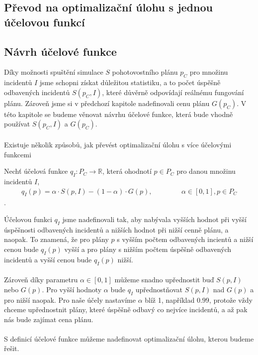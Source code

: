 \subsection{Převod na optimalizační úlohu s jednou účelovou funkcí}

\subsection{Návrh účelové funkce}

Díky možnosti spuštění simulace $S$ pohotovostního plánu $p_C$ pro množinu incidentů $I$ jsme schopni získat důležitou statistiku, a to počet úspěšně odbavených incidentů $S(p_C, I)$,
které důvěrně odpovídají reálnému fungování plánu. Zároveň jsme si v předchozí kapitole %
nadefinovali cenu plánu $G(p_C)$. V této kapitole se budeme věnovat návrhu účelové funkce, která bude vhodně používat $S(p_C, I)$ a $G(p_C)$.
\\
\\
Existuje několik způsobů, jak převést optimalizační úlohu s více účelovými funkcemi

\begin{definice}
Nechť účelová funkce $q_I \colon P_C \rightarrow \mathbb{R}$, která ohodnotí $p \in P_C$ pro danou množinu incidentů $I$,
  \begin{align}
    q_I(p) = \alpha \cdot S(p, I) - (1 - \alpha) \cdot G(p), \hspace{50pt} \alpha \in [0, 1], p \in P_C
  \end{align}
  .
\end{definice}

Účelovou funkci $q_I$ jsme nadefinovali tak, aby nabývala vyšších hodnot při vyšší úspěšnosti odbavených incidentů a nižších hodnot při nižší cenně plánu, a naopak.
To znamená, že pro plány $p$ s vyšším počtem odbavených incientů a nižší cenou bude $q_I(p)$ vyšší
a pro plány s nižším počtem úspěšně odbavených incidentů a vyšší cenou bude $q_I(p)$ nižší.
\\
\\
Zároveň díky parametru $\alpha \in [0, 1]$ můžeme snadno upřednostit buď $S(p, I)$ nebo $G(p)$.
Pro vyšší hodnoty $\alpha$ bude $q_I$ upřednostňovat $S(p, I)$ nad $G(p)$ a pro nižší naopak.
Pro naše účely nastavíme $\alpha$ blíž 1, například $0.99$, protože vždy chceme upřednostnit plány, které úspěšně odbavý co nejvíce incidentů, a až pak nás bude zajímat cena plánu. 
\\
\\
S definicí účelové funkce můžeme nadefinovat optimalizační úlohu, kterou budeme řešit.

